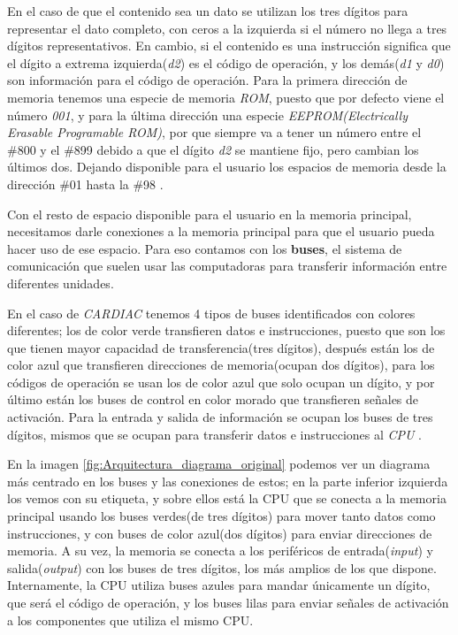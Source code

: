 \documentclass[letterpaper,12pt,oneside]{book}
\begin{document}
	En el caso de que el contenido sea un dato se utilizan los tres dígitos para representar el dato completo, con ceros a la 	
	izquierda si el número no llega a tres dígitos representativos. En cambio, si el contenido es una instrucción significa que el dígito a extrema 
	izquierda(\textit{d2})
	es el código de operación, y los demás(\textit{d1} y \textit{d0}) son información para el código de operación. Para la primera dirección de memoria 
	tenemos una especie de memoria \textit{ROM}, puesto
	que por defecto viene el número \textit{001}, y para la última dirección una especie \textit{EEPROM(Electrically Erasable Programable ROM)}, por
	que siempre va a tener un número entre el \#800 y el \#899 debido a que el dígito \textit{d2} se mantiene fijo, pero cambian los últimos 
	dos. Dejando disponible para el usuario los espacios de memoria desde la dirección \#01 hasta la \#98 \cite{fingerman_instruction_1968}.
	
	Con el resto de espacio disponible para el usuario en la memoria principal, necesitamos darle conexiones a la memoria principal para
	que el usuario pueda hacer uso de ese espacio. Para eso contamos con los \textbf{buses}, el sistema de comunicación que suelen
	usar las computadoras para transferir información entre diferentes unidades\cite{fingerman_instruction_1968}.
 
    En el caso de \textit{CARDIAC} tenemos 4 tipos de buses
	identificados con colores diferentes; los de color verde transfieren datos e instrucciones, puesto que son los que tienen mayor
	capacidad de transferencia(tres dígitos), después están los de color azul que transfieren direcciones de memoria(ocupan dos dígitos),
	para los códigos de operación se usan los de color azul que solo ocupan un dígito, y por último están los buses de control en color morado
	que transfieren señales de activación. Para la entrada y salida de información se ocupan los buses de tres dígitos, mismos que
	se ocupan para transferir datos e instrucciones al \textit{CPU} \cite{fingerman_instruction_1968}.
	
	En la imagen \ref{fig:Arquitectura_diagrama_original} podemos ver un diagrama más centrado en los buses
	y las conexiones de estos; en la parte inferior izquierda los vemos con su etiqueta, y sobre ellos
	está la CPU que se conecta a la memoria principal usando los buses verdes(de tres dígitos) para mover tanto datos como instrucciones, y
	con buses de color azul(dos dígitos) para enviar direcciones de memoria. A su vez, la memoria se conecta a los periféricos de entrada(\textit{input})
	y salida(\textit{output}) con los buses de tres dígitos, los más amplios de los que dispone.
	Internamente, la CPU utiliza buses azules para mandar únicamente un
	dígito, que será el código de operación, y los buses lilas para enviar señales de activación a los componentes que utiliza el mismo
	CPU.	
	
\end{document}

